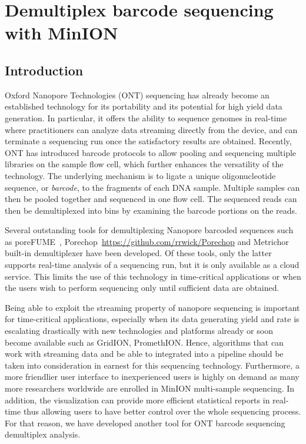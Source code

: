 \section{Demultiplex barcode sequencing with MinION}
\subsection{Introduction}

Oxford Nanopore Technologies (ONT) sequencing has already become an established technology for its portability and its potential for high yield data generation. 
In particular, it offers the ability to sequence genomes in real-time where practitioners can analyze data streaming directly from the device, and can terminate a sequencing run once the satisfactory results are obtained. Recently, ONT has introduced barcode protocols to allow pooling and sequencing multiple libraries on the sample flow cell, which further enhances the versatility of the technology. The underlying mechanism is to ligate a unique oligonucleotide sequence, or \emph{barcode}, to the fragments of each DNA sample. Multiple samples can then be pooled together and sequenced in one flow cell. The sequenced reads can then be demultiplexed into bins by examining the barcode portions on the reads.

Several outstanding tools for demultiplexing Nanopore barcoded sequences such as poreFUME~\cite{Van2017rapid}, Porechop~\url{https://github.com/rrwick/Porechop} and Metrichor built-in demultiplexer have been developed. Of these tools, only the latter supports real-time analysis of a sequencing run, but it is only available as a cloud service. This limits the use of this technology in time-critical applications or when the users wish to perform sequencing only until sufficient data are obtained.

Being able to exploit the streaming property of nanopore sequencing is important for time-critical applications, especially when its data generating yield and rate is escalating drastically with new technologies and platforms already or soon become available such as GridION, PromethION.
Hence, algorithms that can work with streaming data and be able to integrated into a pipeline should be taken into consideration in earnest for this sequencing technology. Furthermore, a more friendlier user interface to inexperienced users is highly on demand as many more researchers worldwide are enrolled in MinION  multi-sample sequencing. In addition, the visualization can provide more efficient statistical reports in real-time thus allowing users to have better control over the whole sequencing process.
For that reason, we have developed another tool for ONT barcode sequencing demultiplex analysis. 

